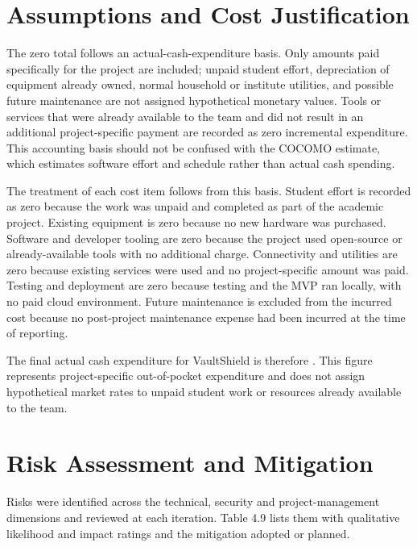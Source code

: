 \documentclass[12pt,a4paper,oneside]{report}
\begin{document}
\section{Assumptions and Cost Justification}\label{assumptions-and-cost-justification}

The zero total follows an actual-cash-expenditure basis. Only amounts paid specifically for the project are included; unpaid student effort, depreciation of equipment already owned, normal household or institute utilities, and possible future maintenance are not assigned hypothetical monetary values. Tools or services that were already available to the team and did not result in an additional project-specific payment are recorded as zero incremental expenditure. This accounting basis should not be confused with the COCOMO estimate, which estimates software effort and schedule rather than actual cash spending.


The treatment of each cost item follows from this basis. Student effort is recorded as zero because the work was unpaid and completed as part of the academic project. Existing equipment is zero because no new hardware was purchased. Software and developer tooling are zero because the project used open-source or already-available tools with no additional charge. Connectivity and utilities are zero because existing services were used and no project-specific amount was paid. Testing and deployment are zero because testing and the MVP ran locally, with no paid cloud environment. Future maintenance is excluded from the incurred cost because no post-project maintenance expense had been incurred at the time of reporting.

The final actual cash expenditure for VaultShield is therefore . This figure represents project-specific out-of-pocket expenditure and does not assign hypothetical market rates to unpaid student work or resources already available to the team.

\section{Risk Assessment and Mitigation}\label{risk-assessment-and-mitigation}

Risks were identified across the technical, security and project-management dimensions and reviewed at each iteration. Table 4.9 lists them with qualitative likelihood and impact ratings and the mitigation adopted or planned.

\begingroup\small
\end{document}

